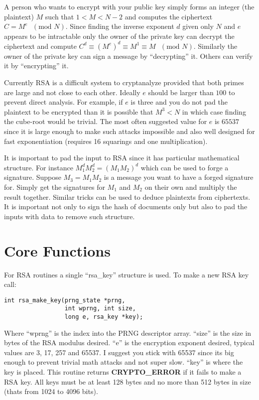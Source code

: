 \documentclass{book}
\begin{document}
A person who wants to encrypt with your public key simply forms an integer (the plaintext) $M$ such that 
$1 < M < N-2$ and computes the ciphertext $C = M^e\mbox{ }(\mbox{mod }N)$.  Since finding the inverse exponent $d$
given only $N$ and $e$ appears to be intractable only the owner of the private key can decrypt the ciphertext and compute
$C^d \equiv \left (M^e \right)^d \equiv M^1 \equiv M\mbox{ }(\mbox{mod }N)$.  Similarly the owner of the private key 
can sign a message by ``decrypting'' it.  Others can verify it by ``encrypting'' it.  

Currently RSA is a difficult system to cryptanalyze provided that both primes are large and not close to each other.  
Ideally $e$ should be larger than $100$ to prevent direct analysis.  For example, if $e$ is three and you do not pad
the plaintext to be encrypted than it is possible that $M^3 < N$ in which case finding the cube-root would be trivial.  
The most often suggested value for $e$ is $65537$ since it is large enough to make such attacks impossible and also well 
designed for fast exponentiation (requires 16 squarings and one multiplication).

It is important to pad the input to RSA since it has particular mathematical structure.  For instance  
$M_1^dM_2^d = (M_1M_2)^d$ which can be used to forge a signature.  Suppose $M_3 = M_1M_2$ is a message you want
to have a forged signature for.  Simply get the signatures for $M_1$ and $M_2$ on their own and multiply the result
together.  Similar tricks can be used to deduce plaintexts from ciphertexts.  It is important not only to sign 
the hash of documents only but also to pad the inputs with data to remove such structure.  

\section{Core Functions}

For RSA routines a single ``rsa\_key'' structure is used.  To make a new RSA key call:
\begin{verbatim}
int rsa_make_key(prng_state *prng, 
                 int wprng, int size, 
                 long e, rsa_key *key);
\end{verbatim}

Where ``wprng'' is the index into the PRNG descriptor array.  ``size'' is the size in bytes of the RSA modulus desired.
``e'' is the encryption exponent desired, typical values are 3, 17, 257 and 65537.  I suggest you stick with 65537 since its big
enough to prevent trivial math attacks and not super slow.  ``key'' is where the key is placed.  This routine returns
{\bf CRYPTO\_ERROR} if it fails to make a RSA key.  All keys must be at least 128 bytes and no more than 512 bytes
in size (thats from 1024 to 4096 bits).
\end{document}
